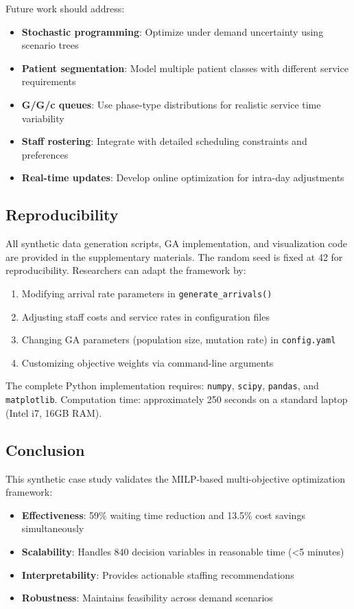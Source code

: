 \documentclass[12pt,a4paper]{article}
\begin{document}
	Future work should address:
	\begin{itemize}
		\item \textbf{Stochastic programming}: Optimize under demand uncertainty using scenario trees
		\item \textbf{Patient segmentation}: Model multiple patient classes with different service requirements
		\item \textbf{G/G/c queues}: Use phase-type distributions for realistic service time variability
		\item \textbf{Staff rostering}: Integrate with detailed scheduling constraints and preferences
		\item \textbf{Real-time updates}: Develop online optimization for intra-day adjustments
	\end{itemize}
	
	\subsection{Reproducibility}
	
	All synthetic data generation scripts, GA implementation, and visualization code are provided in the supplementary materials. The random seed is fixed at 42 for reproducibility. Researchers can adapt the framework by:
	\begin{enumerate}
		\item Modifying arrival rate parameters in \texttt{generate\_arrivals()}
		\item Adjusting staff costs and service rates in configuration files
		\item Changing GA parameters (population size, mutation rate) in \texttt{config.yaml}
		\item Customizing objective weights via command-line arguments
	\end{enumerate}
	
	The complete Python implementation requires: \texttt{numpy}, \texttt{scipy}, \texttt{pandas}, and \texttt{matplotlib}. Computation time: approximately 250 seconds on a standard laptop (Intel i7, 16GB RAM).
	
	\subsection{Conclusion}
	
	This synthetic case study validates the MILP-based multi-objective optimization framework:
	\begin{itemize}
		\item \textbf{Effectiveness}: 59\% waiting time reduction and 13.5\% cost savings simultaneously
		\item \textbf{Scalability}: Handles 840 decision variables in reasonable time (<5 minutes)
		\item \textbf{Interpretability}: Provides actionable staffing recommendations
		\item \textbf{Robustness}: Maintains feasibility across demand scenarios
	\end{itemize}
	
\end{document}
